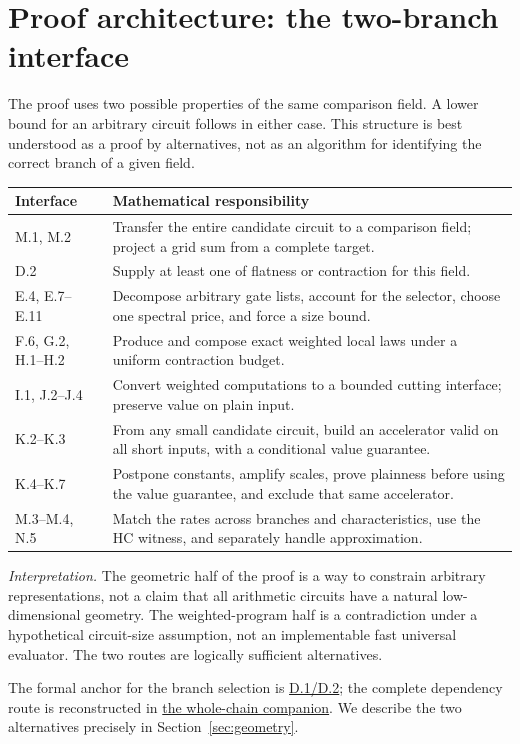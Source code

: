 \documentclass[11pt,letterpaper]{article}
\theoremstyle{definition}\newtheorem{definition}[theorem]{Definition}\newtheorem{example}[theorem]{Example}
\theoremstyle{remark}\newtheorem{remark}[theorem]{Remark}
\newcommand{\pub}[3]{\href{https://github.com/anthropics/formal-math/blob/11b6c7e3c927df2658f513b6b68ea7f8929c62c5/vp-vnp/#1\#L#2}{#3}}
\newcommand{\aud}[2]{\href{https://github.com/nousentllc/VP-VNP-Review/blob/567303d0bcf4f9d54390437b137752446e58ccd6/#1}{#2}}
\newcommand{\interpret}[1]{\par\smallskip\noindent\textit{Interpretation.} #1\par\smallskip}
\begin{document}
\section{Proof architecture: the two-branch interface}\label{sec:map}
The proof uses two possible properties of the same comparison field. A lower bound for an arbitrary circuit follows in either case. This structure is best understood as a proof by alternatives, not as an algorithm for identifying the correct branch of a given field.
\begin{center}
\begin{tabular}{@{}p{.28\linewidth}p{.62\linewidth}@{}}
\toprule
Interface & Mathematical responsibility \\\midrule
M.1, M.2 & Transfer the entire candidate circuit to a comparison field; project a grid sum from a complete target. \\
D.2 & Supply at least one of flatness or contraction for this field. \\
E.4, E.7--E.11 & Decompose arbitrary gate lists, account for the selector, choose one spectral price, and force a size bound. \\
F.6, G.2, H.1--H.2 & Produce and compose exact weighted local laws under a uniform contraction budget. \\
I.1, J.2--J.4 & Convert weighted computations to a bounded cutting interface; preserve value on plain input. \\
K.2--K.3 & From any small candidate circuit, build an accelerator valid on all short inputs, with a conditional value guarantee. \\
K.4--K.7 & Postpone constants, amplify scales, prove plainness before using the value guarantee, and exclude that same accelerator. \\
M.3--M.4, N.5 & Match the rates across branches and characteristics, use the HC witness, and separately handle approximation. \\\bottomrule
\end{tabular}
\end{center}
\interpret{The geometric half of the proof is a way to constrain arbitrary representations, not a claim that all arithmetic circuits have a natural low-dimensional geometry. The weighted-program half is a contradiction under a hypothetical circuit-size assumption, not an implementable fast universal evaluator. The two routes are logically sufficient alternatives.}
The formal anchor for the branch selection is \pub{Paper/Alternative.lean}{43}{D.1/D.2}; the complete dependency route is reconstructed in \aud{passes/14e-circuit-to-contradiction.md}{the whole-chain companion}. We describe the two alternatives precisely in Section~\ref{sec:geometry}.
\end{document}
